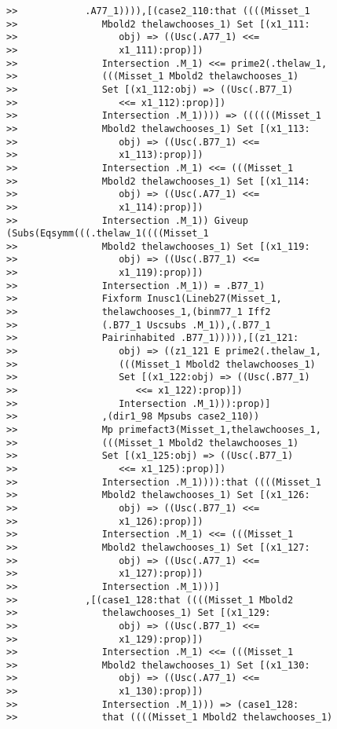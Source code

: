 \documentclass[12pt]{article}
\begin{document}
\begin{verbatim}
>>            .A77_1)))),[(case2_110:that ((((Misset_1
>>               Mbold2 thelawchooses_1) Set [(x1_111:
>>                  obj) => ((Usc(.A77_1) <<=
>>                  x1_111):prop)])
>>               Intersection .M_1) <<= prime2(.thelaw_1,
>>               (((Misset_1 Mbold2 thelawchooses_1)
>>               Set [(x1_112:obj) => ((Usc(.B77_1)
>>                  <<= x1_112):prop)])
>>               Intersection .M_1)))) => ((((((Misset_1
>>               Mbold2 thelawchooses_1) Set [(x1_113:
>>                  obj) => ((Usc(.B77_1) <<=
>>                  x1_113):prop)])
>>               Intersection .M_1) <<= (((Misset_1
>>               Mbold2 thelawchooses_1) Set [(x1_114:
>>                  obj) => ((Usc(.A77_1) <<=
>>                  x1_114):prop)])
>>               Intersection .M_1)) Giveup (Subs(Eqsymm(((.thelaw_1((((Misset_1
>>               Mbold2 thelawchooses_1) Set [(x1_119:
>>                  obj) => ((Usc(.B77_1) <<=
>>                  x1_119):prop)])
>>               Intersection .M_1)) = .B77_1)
>>               Fixform Inusc1(Lineb27(Misset_1,
>>               thelawchooses_1,(binm77_1 Iff2
>>               (.B77_1 Uscsubs .M_1)),(.B77_1
>>               Pairinhabited .B77_1))))),[(z1_121:
>>                  obj) => ((z1_121 E prime2(.thelaw_1,
>>                  (((Misset_1 Mbold2 thelawchooses_1)
>>                  Set [(x1_122:obj) => ((Usc(.B77_1)
>>                     <<= x1_122):prop)])
>>                  Intersection .M_1))):prop)]
>>               ,(dir1_98 Mpsubs case2_110))
>>               Mp primefact3(Misset_1,thelawchooses_1,
>>               (((Misset_1 Mbold2 thelawchooses_1)
>>               Set [(x1_125:obj) => ((Usc(.B77_1)
>>                  <<= x1_125):prop)])
>>               Intersection .M_1)))):that ((((Misset_1
>>               Mbold2 thelawchooses_1) Set [(x1_126:
>>                  obj) => ((Usc(.B77_1) <<=
>>                  x1_126):prop)])
>>               Intersection .M_1) <<= (((Misset_1
>>               Mbold2 thelawchooses_1) Set [(x1_127:
>>                  obj) => ((Usc(.A77_1) <<=
>>                  x1_127):prop)])
>>               Intersection .M_1)))]
>>            ,[(case1_128:that ((((Misset_1 Mbold2
>>               thelawchooses_1) Set [(x1_129:
>>                  obj) => ((Usc(.B77_1) <<=
>>                  x1_129):prop)])
>>               Intersection .M_1) <<= (((Misset_1
>>               Mbold2 thelawchooses_1) Set [(x1_130:
>>                  obj) => ((Usc(.A77_1) <<=
>>                  x1_130):prop)])
>>               Intersection .M_1))) => (case1_128:
>>               that ((((Misset_1 Mbold2 thelawchooses_1)

\end{verbatim}
\end{document}
